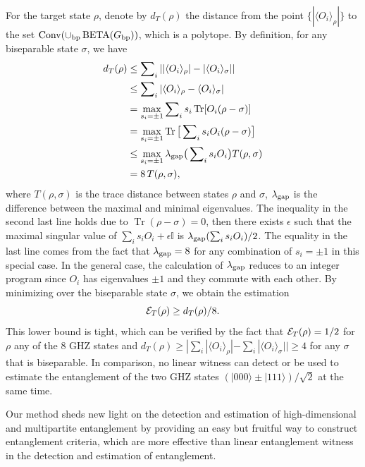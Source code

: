 \documentclass[
12pt,
prx,
aps,
reprint,
a4paper,
longbibliograph,
nofootinbib,
nobibnotes,
superscriptaddress
]{revtex4-2}
\theoremstyle{definition}
\DeclareMathOperator\tr{Tr}
\def\id{\mathbb{I}}%
\def\conv{\mathrm{Conv}}
\def\be{\operatorname{BETA}}
\begin{document}
For the target state $\rho$, denote by $d_T(\rho)$ the distance from the point $\{|\langle O_i\rangle_{\rho}|\}$ to the set $\conv(\cup_{\rm bp}\be(G_{\rm bp}))$, which is a polytope. By definition, for any biseparable state $\sigma$, we have
\allowdisplaybreaks
\begin{align}
  d_T(\rho) &\le \sum\nolimits_i ||\langle O_i\rangle_{\rho}| - |\langle O_i\rangle_{\sigma}|| \nonumber\\
	    &\le \sum\nolimits_i |\langle O_i\rangle_{\rho} - \langle O_i\rangle_{\sigma}|  \nonumber\\
	    &= \max_{s_i = \pm 1}\sum\nolimits_i s_i \tr[O_i(\rho - \sigma)] \nonumber\\
	    &= \max_{s_i = \pm 1}\tr\big[\sum\nolimits_i s_i O_i(\rho - \sigma)\big] \nonumber\\
	    &\le \max_{s_i = \pm 1} \lambda_{\rm gap} \big( \sum\nolimits_i s_i O_i \big) T(\rho, \sigma) \nonumber\\
	    &= 8\, T(\rho,\sigma),
\end{align}
where $T(\rho,\sigma)$ is the trace distance between states $\rho$ and $\sigma$, $\lambda_{\rm gap}$ is the difference between the maximal and minimal eigenvalues.
The inequality in the second last line holds due to $\tr(\rho-\sigma)=0$, then there exists $\epsilon$ such that the maximal singular value of $\sum_i s_i O_i + \epsilon \id$ is $\lambda_{\rm gap}(\sum_i s_i O_i)/2$.  The equality in the last line comes from the fact that $\lambda_{\rm gap}=8$ for any combination of $s_i=\pm 1$ in this special case. In the general case, the calculation of $\lambda_{\rm gap}$ reduces to an integer program since $O_i$ has eigenvalues $\pm 1$ and they commute with each other.
By minimizing over the biseparable state $\sigma$, we obtain the estimation
\begin{equation}
	{\cal E}_T(\rho) \ge d_T(\rho)/8.
\end{equation}
This lower bound is tight, which can be verified by the fact that ${\cal E}_T(\rho) = 1/2$ for $\rho$ any of the $8$ GHZ states and
$d_T(\rho) \ge |\sum_i |\langle O_i\rangle_{\rho}| - \sum_i |\langle O_i\rangle_{\sigma}|| \ge 4$ for any $\sigma$ that is biseparable. 
In comparison, no linear witness can detect or be used to estimate the entanglement of the two GHZ states $(|000\rangle \pm |111\rangle)/\sqrt{2}$ at the same time.

Our method sheds new light on the detection and estimation of high-dimensional and multipartite entanglement by providing an easy but fruitful way to construct entanglement criteria, which are more effective than linear entanglement witness in the detection and estimation of entanglement.
\end{document}
